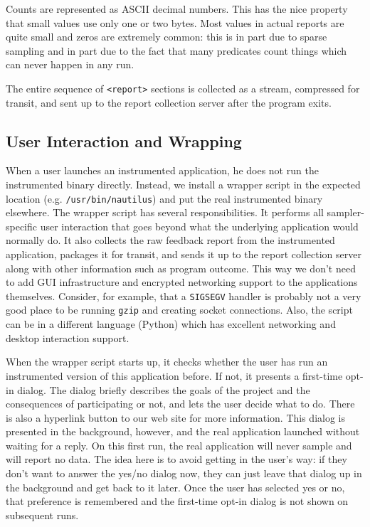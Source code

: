 \documentclass[times,10pt,twocolumn]{article}
\begin{document}
Counts are represented as ASCII decimal numbers.  This has the nice
property that small values use only one or two bytes.  Most values
in actual reports are quite small and zeros are extremely common: this
is in part due to sparse sampling and in part due to the fact that
many predicates count things which can never happen in any run.

The entire sequence of \texttt{<report>} sections is collected as a
stream, compressed for transit, and sent up to the report collection
server after the program exits.

\subsection{User Interaction and Wrapping}

When a user launches an instrumented application, he does not run the
instrumented binary directly.  Instead, we install a wrapper script in
the expected location (e.g. \texttt{/usr/bin/nautilus}) and put the
real instrumented binary elsewhere.  The wrapper script has several
responsibilities.  It performs all sampler-specific user interaction
that goes beyond what the underlying application would normally do.
It also collects the raw feedback report from the instrumented
application, packages it for transit, and sends it up to the report
collection server along with other information such as program
outcome.  This way we don't need to add GUI infrastructure and
encrypted networking support to the applications themselves.
Consider, for example, that a \texttt{SIGSEGV} handler is probably not
a very good place to be running \texttt{gzip} and creating socket
connections.  Also, the script can be in a different language (Python)
which has excellent networking and desktop interaction support.

When the wrapper script starts up, it checks whether the user has run
an instrumented version of this application before.  If not, it
presents a first-time opt-in dialog.  The dialog briefly describes the
goals of the project and the consequences of participating or not, and
lets the user decide what to do.  There is also a hyperlink button to
our web site for more information.  This dialog is presented in the
background, however, and the real application launched without waiting
for a reply.  On this first run, the real application will never
sample and will report no data.  The idea here is to avoid getting in
the user's way: if they don't want to answer the yes/no dialog now,
they can just leave that dialog up in the background and get back to
it later.  Once the user has selected yes or no, that preference is
remembered and the first-time opt-in dialog is not shown on subsequent
runs.
\end{document}
